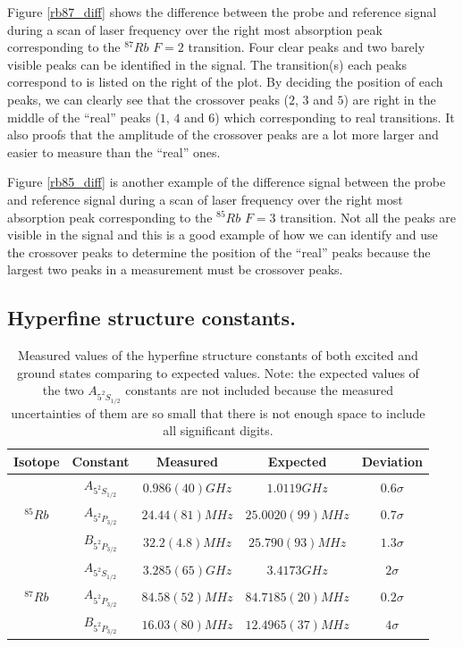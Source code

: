\documentclass[aps,twocolumn,secnumarabic,balancelastpage,amsmath,amssymb,nofootinbib]{revtex4}
\begin{document}
Figure \ref{rb87_diff} shows the difference between the probe and reference signal during a scan of laser frequency over the right most absorption peak corresponding to the  ${}^{87}Rb$ $F=2$ transition. Four clear peaks and two barely visible peaks can be identified in the signal. The transition(s) each peaks correspond to is listed on the right of the plot. By deciding the position of each peaks, we can clearly see that the crossover peaks ($2$, $3$ and $5$) are right in the middle of the ``real'' peaks ($1$, $4$ and $6$) which corresponding to real transitions. It also proofs that the amplitude of the crossover peaks are a lot more larger and easier to measure than the ``real'' ones.

Figure \ref{rb85_diff} is another example of the difference signal between the probe and reference signal during a scan of laser frequency over the right most absorption peak corresponding to the  ${}^{85}Rb$ $F=3$ transition. Not all the peaks are visible in the signal and this is a good example of how we can identify and use the crossover peaks to determine the position of the ``real'' peaks because the largest two peaks in a measurement must be crossover peaks.

\subsection{Hyperfine structure constants.}

\begin{table}
  \begin{tabular}{|c|c|c|c|c|}
    \hline
    Isotope&Constant&Measured&Expected\cite{rubidium85_data,rubidium87_data}&Deviation\\\hline
    &$A_{5^2S_{1/2}}$&$0.986(40)GHz$&$1.0119GHz$&$0.6\sigma$\\\cline{2-5}
    ${}^{85}Rb$&$A_{5^2P_{3/2}}$&$24.44(81)MHz$&$25.0020(99)MHz$&$0.7\sigma$\\\cline{2-5}
    &$B_{5^2P_{3/2}}$&$32.2(4.8)MHz$&$25.790(93)MHz$&$1.3\sigma$\\\hline
    &$A_{5^2S_{1/2}}$&$3.285(65)GHz$&$3.4173GHz$&$2\sigma$\\\cline{2-5}
    ${}^{87}Rb$&$A_{5^2P_{3/2}}$&$84.58(52)MHz$&$84.7185(20)MHz$&$0.2\sigma$\\\cline{2-5}
    &$B_{5^2P_{3/2}}$&$16.03(80)MHz$&$12.4965(37)MHz$&$4\sigma$\\\hline
  \end{tabular}
  \caption{Measured values of the hyperfine structure constants of both excited and ground states comparing to expected values. Note: the expected values of the two $A_{5^2S_{1/2}}$ constants are not included because the measured uncertainties of them are so small that there is not enough space to include all significant digits.}
  \label{hfs_const}
\end{table}
\end{document}
